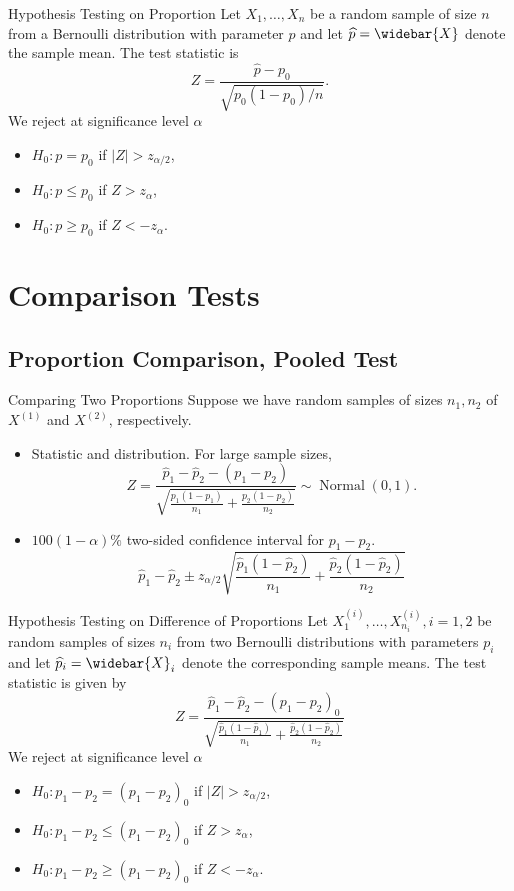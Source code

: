 \documentclass{beamer}
\begin{document}
\begin{frame}{Hypothesis Testing on Proportion}
Let $X_{1}, \ldots, X_{n}$ be a random sample of size $n$ from a Bernoulli distribution with parameter $p$ and let $\widehat{p}=\widebar{X}$ denote the sample mean. The test statistic is
$$
Z=\frac{\widehat{p}-p_{0}}{\sqrt{p_{0}\left(1-p_{0}\right) / n}} .
$$
We reject at significance level $\alpha$
\begin{itemize}
\item $H_{0}: p=p_{0}$ if $|Z|>z_{\alpha / 2}$,
\item $H_{0}: p \leq p_{0}$ if $Z>z_{\alpha}$,
\item $H_{0}: p \geq p_{0}$ if $Z<-z_{\alpha}$.
\end{itemize}
\end{frame}

\section{Comparison Tests}
\subsection{Proportion Comparison, Pooled Test}
\begin{frame}{Comparing Two Proportions}
Suppose we have random samples of sizes $n_{1}, n_{2}$ of $X^{(1)}$ and $X^{(2)}$, respectively.
\begin{itemize}
\item Statistic and distribution. For large sample sizes,
$$
Z=\frac{\widehat{p}_{1}-\widehat{p}_{2}-\left(p_{1}-p_{2}\right)}{\sqrt{\frac{p_{1}\left(1-p_{1}\right)}{n_{1}}+\frac{p_{2}\left(1-p_{2}\right)}{n_{2}}}} \sim \operatorname{Normal}(0,1) .
$$
\item $100(1-\alpha) \%$ two-sided confidence interval for $p_{1}-p_{2}$.
$$
\widehat{p}_{1}-\widehat{p}_{2} \pm z_{\alpha / 2} \sqrt{\frac{\widehat{p}_{1}\left(1-\widehat{p}_{2}\right)}{n_{1}}+\frac{\widehat{p}_{2}\left(1-\widehat{p}_{2}\right)}{n_{2}}}
$$
\end{itemize}
\end{frame}

\begin{frame}{Hypothesis Testing on Difference of Proportions}
Let $X_{1}^{(i)}, \ldots, X_{n_{i}}^{(i)}, i=1,2$ be random samples of sizes $n_{i}$ from two Bernoulli distributions with parameters $p_{i}$ and let $\widehat{p}_{i}=\widebar{X}_{i}$ denote the corresponding sample means. The test statistic is given by
$$
Z=\frac{\widehat{p}_{1}-\widehat{p}_{2}-\left(p_{1}-p_{2}\right)_{0}}{\sqrt{\frac{\widehat{p}_{1}\left(1-\widehat{p}_{1}\right)}{n_{1}}+\frac{\widehat{p}_{2}\left(1-\widehat{p}_{2}\right)}{n_{2}}}}
$$
We reject at significance level $\alpha$
\begin{itemize}
\item $H_{0}: p_{1}-p_{2}=\left(p_{1}-p_{2}\right)_{0}$ if $|Z|>z_{\alpha / 2}$,
\item $H_{0}: p_{1}-p_{2} \leq\left(p_{1}-p_{2}\right)_{0}$ if $Z>z_{\alpha}$,
\item $H_{0}: p_{1}-p_{2} \geq\left(p_{1}-p_{2}\right)_{0}$ if $Z<-z_{\alpha}$.
\end{itemize}
\end{frame}
\end{document}
